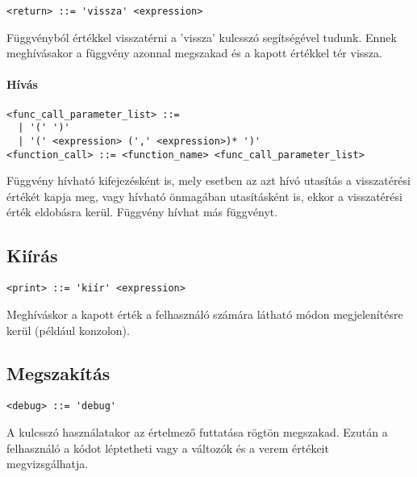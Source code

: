 \begin{footnotesize}
\begin{verbatim}
<return> ::= 'vissza' <expression>
\end{verbatim}
\end{footnotesize}

Függvényból értékkel visszatérni a 'vissza' kulcsszó segítségével tudunk. Ennek meghívásakor a függvény azonnal megszakad és a kapott értékkel tér vissza.

\paragraph{Hívás}

\begin{footnotesize}
\begin{verbatim}
<func_call_parameter_list> ::= 
  | '(' ')' 
  | '(' <expression> (',' <expression>)* ')'
<function_call> ::= <function_name> <func_call_parameter_list>
\end{verbatim}
\end{footnotesize}

Függvény hívható kifejezésként is, mely esetben az azt hívó utasítás a visszatérési értékét kapja meg, vagy hívható önmagában utasításként is, ekkor a visszatérési érték eldobásra kerül. Függvény hívhat más függvényt.

\subsection{Kiírás}

\begin{footnotesize}
\begin{verbatim}
<print> ::= 'kiír' <expression>
\end{verbatim}
\end{footnotesize}

Meghíváskor a kapott érték a felhasználó számára látható módon megjelenítésre kerül (például konzolon).

\subsection{Megszakítás}

\begin{footnotesize}
\begin{verbatim}
<debug> ::= 'debug'
\end{verbatim}
\end{footnotesize}

A kulcsszó használatakor az értelmező futtatása rögtön megszakad. Ezután a felhasználó a kódot léptetheti vagy a változók és a verem értékeit megvizsgálhatja.

